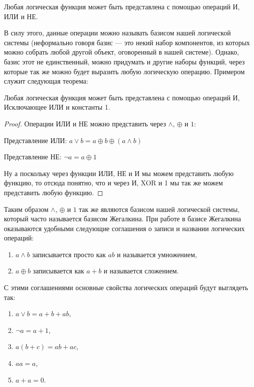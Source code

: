 \begin{thm}Любая логическая функция может быть представлена с помощью операций И, ИЛИ и НЕ.\end{thm}

В силу этого, данные операции можно называть базисом нашей логической системы (неформально говоря базис — это некий набор компонентов, из которых можно собрать любой другой объект, оговоренный в нашей системе). Однако, базис этот не единственный, можно придумать и другие наборы функций, через которые так же можно будет выразить любую логическую операцию. Примером служит следующая теорема:

\begin{thm}Любая логическая функция может быть представлена с помощью операций И, Исключающее ИЛИ и константы 1.\end{thm}

\begin{proof}Операции ИЛИ и НЕ можно представить через $\wedge$, $\oplus$ и $1$:

Представление ИЛИ: $a\vee b = a \oplus b \oplus (a\wedge b)$

Представление НЕ: $\neg a = a \oplus 1$

Ну а поскольку через функции ИЛИ, НЕ и И мы можем представить любую функцию, то отсюда понятно, что и через И, XOR и 1 мы так же можем представить любую функцию.\end{proof}

Таким образом $\wedge$, $\oplus$ и $1$ так же являются базисом нашей логической системы, который часто называется базисом Жегалкина. При работе в базисе Жегалкина оказываются удобными следующие соглашения о записи и названии логических операций:

\begin{enumerate}
\item $a\wedge b$ записывается просто как $ab$ и называется умножением,
\item $a \oplus b$ записывается как $a + b$ и называется сложением.
\end{enumerate}

С этими соглашениями основные свойства логических операций будут выглядеть так:

\begin{enumerate}
\item $a\vee b=a + b +ab$,
\item $\neg a = a + 1$,
\item $a(b+c) = ab + ac$,
\item $aa = a$,
\item $a + a = 0$.
\end{enumerate}

